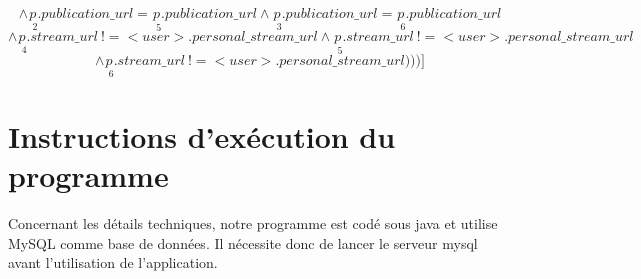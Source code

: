 \documentclass[a4paper,10pt]{article}
\begin{document}
\begin{enumerate}
{\begin{minipage}{1.0\textwidth}
		\begin{equation}
		\wedge \underset{\ \ 2}{p}.publication\_url =  \underset{\ \ 5}{p}.publication\_url \wedge \underset{\ \ 3}{p}.publication\_url =  \underset{\ \ 6}{p}.publication\_url 
		\end{equation}
		\begin{equation}
		\wedge \underset{\ \ 4}{p}.stream\_url  \ !=  <user>.personal\_stream\_url \wedge \underset{\ \ 5}{p}.stream\_url  \ !=  <user>.personal\_stream\_url
		\end{equation}
		\begin{equation}
		\wedge \underset{\ \ 6}{p}.stream\_url  \ !=  <user>.personal\_stream\_url)))]
		\end{equation}
         \end{minipage}}
	\end{enumerate}

\section{Instructions d'exécution du programme}

Concernant les détails techniques, notre programme est codé sous java et utilise MySQL comme base de données. Il nécessite donc de lancer le serveur mysql avant l'utilisation de l'application.
\end{document}
